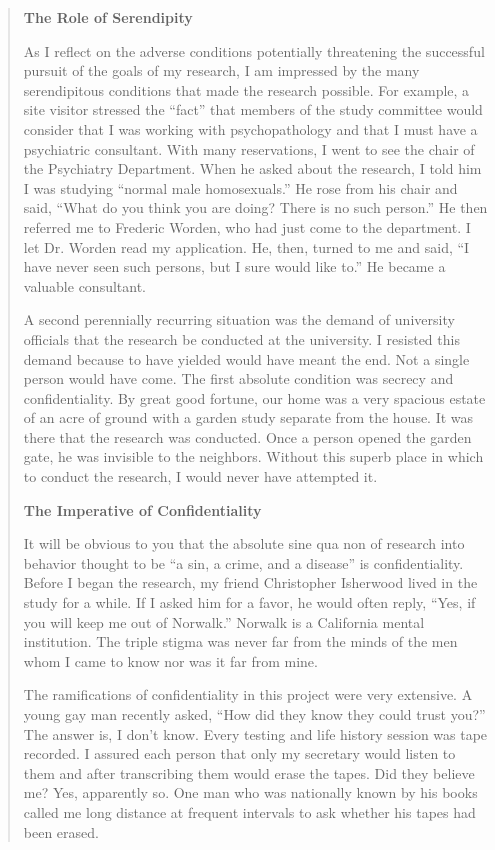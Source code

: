 \begin{quote}
\textbf{The Role of Serendipity} 

As I reflect on the adverse conditions potentially threatening the successful pursuit of the goals of my research, I am impressed by the many serendipitous conditions that made the research possible. For example, a site visitor stressed the ``fact'' that members of the study committee would consider that I was working with psychopathology and that I must have a psychiatric consultant. With many reservations, I went to see the chair of the Psychiatry Department. When he asked about the research, I told him I was studying ``normal male homosexuals.'' He rose from his chair and said, ``What do you think you are doing? There is no such person.'' He then referred me to Frederic Worden, who had just come to the department. I let Dr. Worden read my application. He, then, turned to me and said, ``I have never seen such persons, but I sure would like to.'' He became a valuable consultant.

A second perennially recurring situation was the demand of university officials that the research be conducted at the university. I resisted this demand because to have yielded would have meant the end. Not a single person would have come. The first absolute condition was secrecy and confidentiality. By great good fortune, our home was a very spacious estate of an acre of ground with a garden study separate from the house. It was there that the research was conducted. Once a person opened the garden gate, he was invisible to the neighbors. Without this superb place in which to conduct the research, I would never have attempted it.

\textbf{The Imperative of Confidentiality}

It will be obvious to you that the absolute sine qua non of research into behavior thought to be ``a sin, a crime, and a disease'' is confidentiality. Before I began the research, my friend Christopher Isherwood lived in the study for a while. If I asked him for a favor, he would often reply, ``Yes, if you will keep me out of Norwalk.'' Norwalk is a California mental institution. The triple stigma was never far from the minds of the men whom I came to know nor was it far from mine.

The ramifications of confidentiality in this project were very extensive. A young gay man recently asked, ``How did they know they could trust you?'' The answer is, I don't know. Every testing and life history session was tape recorded. I assured each person that only my secretary would listen to them and after transcribing them would erase the tapes. Did they believe me? Yes, apparently so. One man who was nationally known by his books called me long distance at frequent intervals to ask whether his tapes had been erased.


\end{quote}
